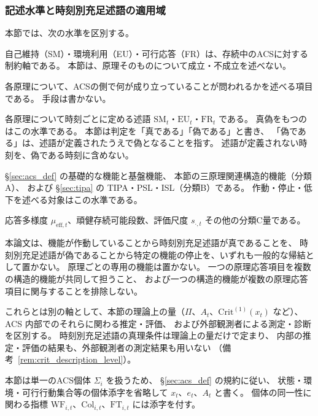 \subsubsection{記述水準と時刻別充足述語の適用域}
\label{subsubsec:s3_levels}

\begin{remark}[本節における記述水準]
\label{rem:s3_description_levels}
本節では、次の水準を区別する。
\begin{description}[style=nextline]
  \item[原理]
  自己維持（SM）・環境利用（EU）・可行応答（FR）は、存続中のACSに対する制約軸である。
  本節は、原理そのものについて成立・不成立を述べない。
  \item[原理応答項目]
  各原理について、ACSの側で何が成り立っていることが問われるかを述べる項目である。
  手段は書かない。
  \item[時刻別充足述語]
  各原理について時刻ごとに定める述語 $\mathrm{SM}_t$・$\mathrm{EU}_t$・$\mathrm{FR}_t$ である。
  真偽をもつのはこの水準である。
  本節は判定を「真である」「偽である」と書き、
  「偽である」は、述語が定義されたうえで偽となることを指す。
  述語が定義されない時刻を、偽である時刻に含めない。
  \item[構造的機能と標準機能形式]
  \S\ref{sec:acs_def} の基礎的な機能と基盤機能、
  本節の三原理関連構造的機能（分類A）、
  および \S\ref{sec:tipa} の TIPA・PSL・ISL（分類B）である。
  作動・停止・低下を述べる対象はこの水準である。
  \item[診断量]
  応答多様度 $\mu_{\mathrm{eff},t}$、頑健存続可能段数、評価尺度 $s_{\cdot,t}$ その他の分類C量である。
\end{description}
本論文は、機能が作動していることから時刻別充足述語が真であることを、
時刻別充足述語が偽であることから特定の機能の停止を、いずれも一般的な帰結として置かない。
原理ごとの専用の機能は置かない。
一つの原理応答項目を複数の構造的機能が共同して担うこと、
および一つの構造的機能が複数の原理応答項目に関与することを排除しない。

これらとは別の軸として、本節の理論上の量（$\Pi$、$A_t$、$\mathrm{Crit}^{(1)}(x_t)$ など）、
ACS 内部でのそれらに関わる推定・評価、
および外部観測者による測定・診断を区別する。
時刻別充足述語の真理条件は理論上の量だけで定まり、
内部の推定・評価の結果も、外部観測者の測定結果も用いない
（備考~\ref{rem:crit_description_level}）。
\end{remark}

本節は単一のACS個体 $\Sigma_i$ を扱うため、
\S\ref{sec:acs_def} の規約に従い、
状態・環境・可行行動集合等の個体添字を省略して
$x_t$、$e_t$、$A_t$ と書く。
個体の同一性に関わる指標
$\mathrm{WF}_{i,t}$、$\mathrm{Col}_{i,t}$、$\mathrm{FT}_{i,t}$ には添字を付す。

